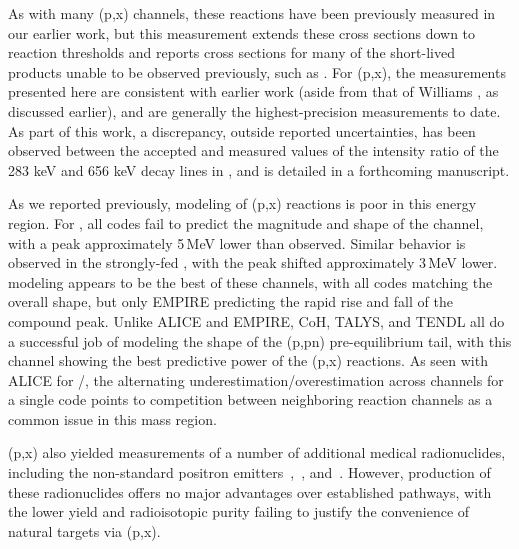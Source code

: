 As with many (p,x) channels, these reactions have been previously measured in our earlier work, but this measurement extends these cross sections down to reaction thresholds and reports cross sections for many of the short-lived products unable to be observed previously, such as  \cite{Voyles2018a}.
For (p,x), the measurements presented here are consistent with earlier work (aside from that of Williams \cite{PhysRev.162.1055}, as discussed earlier), and are generally the highest-precision measurements to date.
As part of this work, a discrepancy, outside reported uncertainties, has been observed between the accepted and measured  values of the intensity ratio of the 283 keV and  656 keV decay lines in , and is detailed in a forthcoming manuscript.




As we reported previously, modeling of (p,x) reactions is poor in this energy region.
For , all codes fail to predict the magnitude and shape of the channel, with a peak approximately 5\,MeV lower than observed.
Similar behavior is observed in the strongly-fed ,
with the peak shifted approximately 3\,MeV lower.
 modeling appears to be the best of these channels, with all codes matching the overall shape, but only EMPIRE predicting the rapid rise and fall of the compound peak.
Unlike ALICE and EMPIRE, CoH, TALYS, and TENDL all do a successful job of modeling the shape of the (p,pn) pre-equilibrium tail, with this channel showing the best predictive power of the (p,x) reactions.
As seen with ALICE for /, the alternating underestimation/overestimation across channels for a single code points to competition between neighboring reaction channels as a common issue in this mass region.




(p,x)  also  yielded measurements of  a number of additional  medical  radionuclides,  including the non-standard positron emitters 
\,\cite{PMID:7632762,zweit1996medium,Graves2016,Rosch2014}, 
\,\cite{Szelecsenyi2005a,Fukumura2004}, and
\,\cite{Lewis2003,Bandari2014,mp500671j,Szelecsenyi1993,Aslam2009,Hilgers2003,Szelecsenyi2005,Voyles2017}.
However, production of these radionuclides  offers no major advantages over established  pathways, with the  lower yield and radioisotopic purity failing to justify the convenience of natural targets  via    (p,x). 



